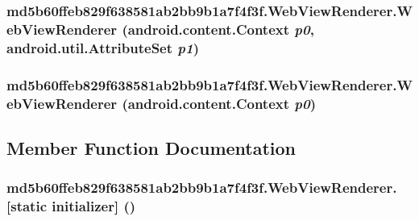 \hypertarget{classmd5b60ffeb829f638581ab2bb9b1a7f4f3f_1_1_web_view_renderer_5d31cef44bb6ebaec7f75139c55577ac}{
\subsubsection[{WebViewRenderer}]{\setlength{\rightskip}{0pt plus 5cm}md5b60ffeb829f638581ab2bb9b1a7f4f3f.WebViewRenderer.WebViewRenderer (android.content.Context {\em p0}, \/  android.util.AttributeSet {\em p1})}}
\label{classmd5b60ffeb829f638581ab2bb9b1a7f4f3f_1_1_web_view_renderer_5d31cef44bb6ebaec7f75139c55577ac}


\hypertarget{classmd5b60ffeb829f638581ab2bb9b1a7f4f3f_1_1_web_view_renderer_d389d22a1a6485d39e52a0d587ca519b}{
\subsubsection[{WebViewRenderer}]{\setlength{\rightskip}{0pt plus 5cm}md5b60ffeb829f638581ab2bb9b1a7f4f3f.WebViewRenderer.WebViewRenderer (android.content.Context {\em p0})}}
\label{classmd5b60ffeb829f638581ab2bb9b1a7f4f3f_1_1_web_view_renderer_d389d22a1a6485d39e52a0d587ca519b}




\subsection{Member Function Documentation}
\hypertarget{classmd5b60ffeb829f638581ab2bb9b1a7f4f3f_1_1_web_view_renderer_104d56fcab06d47e41f1c827759281d5}{
\subsubsection[{[static initializer]}]{\setlength{\rightskip}{0pt plus 5cm}md5b60ffeb829f638581ab2bb9b1a7f4f3f.WebViewRenderer.\mbox{[}static initializer\mbox{]} ()}}
\label{classmd5b60ffeb829f638581ab2bb9b1a7f4f3f_1_1_web_view_renderer_104d56fcab06d47e41f1c827759281d5}




